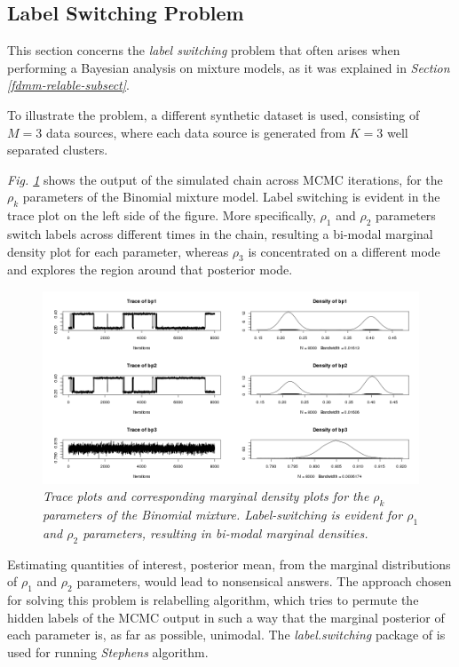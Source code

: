 \subsection{Label Switching Problem} \label{integr-synth-label-sect}
This section concerns the \emph{label switching} problem that often arises when performing a Bayesian analysis on mixture models, as it was explained in \emph{Section \ref{fdmm-relable-subsect}}.

To illustrate the problem, a different synthetic dataset is used, consisting of $M=3$ data sources, where each data source is generated from $K=3$ well separated clusters. 

\emph{Fig. \ref{labelBP-pic}} shows the output of the simulated chain across MCMC iterations, for the $\rho_{k}$ parameters of the Binomial mixture model. Label switching is evident in the trace plot on the left side of the figure. More specifically, $\rho_{1}$ and $\rho_{2}$ parameters switch labels across different times in the chain, resulting a bi-modal marginal density plot for each parameter, whereas $\rho_{3}$ is concentrated on a different mode and explores the region around that posterior mode. 
\begin{figure}[!ht]
\begin{center}
 \includegraphics[scale = 0.42]{images/labelBP.png}
\caption{\emph{Trace plots and corresponding marginal density plots for the $\rho_{k}$ parameters of the Binomial mixture. Label-switching is evident for $\rho_{1}$ and $\rho_{2}$ parameters, resulting in bi-modal marginal densities.}}
\label{labelBP-pic}
\end{center}
\end{figure}

Estimating quantities of interest, \eg posterior mean, from the marginal distributions of $\rho_{1}$ and $\rho_{2}$ parameters, would lead to nonsensical answers. The approach chosen for solving this problem is \citet{Stephens2000} relabelling algorithm, which tries to permute the hidden labels of the MCMC output in such a way that the marginal posterior of each parameter is, as far as possible, unimodal. The \emph{label.switching} package of \citet{Papastamoulis2015} is used for running \emph{Stephens} algorithm. 

